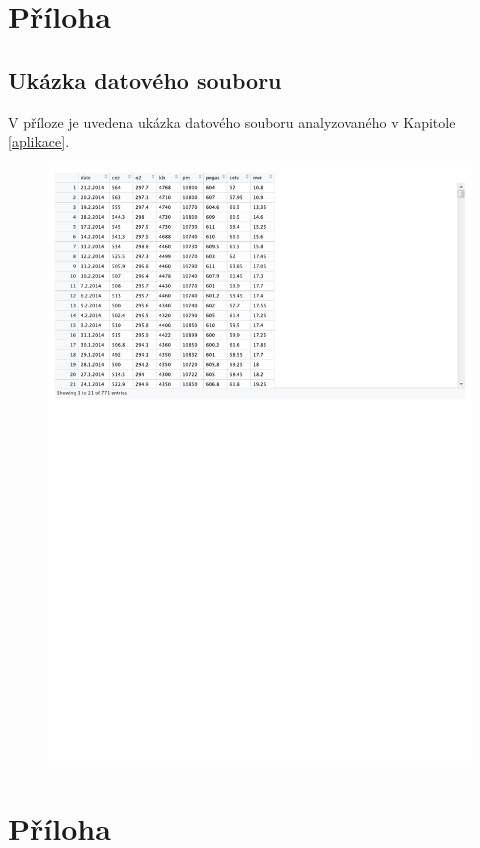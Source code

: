 \documentclass[a4paper,12pt]{report}
\theoremstyle{definition} \newtheorem{definice}[veta]{Definice}
\theoremstyle{remark}
\begin{document}
\chapter[Příloha -- Ukázka datového souboru]{Příloha}\label{priloha_data}
\section*{Ukázka datového souboru}
V příloze je uvedena ukázka datového souboru analyzovaného v Kapitole \ref{aplikace}.
\begin{figure}[!htbp]
  \centering 
\includegraphics[width=12.5cm, clip, trim= 0 510 277 10]{IMG/data_v2.pdf}
\end{figure}

\chapter[Příloha -- Ukázka programů]{Příloha}\label{priloha_programy}
\end{document}
